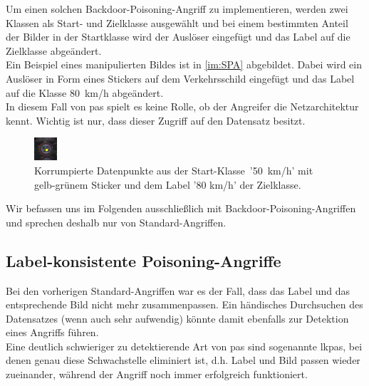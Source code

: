 \documentclass[twoside, 12pt,a4paper]{book}
\numberwithin{equation}{section}
\begin{document}
	\noindent Um einen solchen Backdoor-Poisoning-Angriff zu implementieren, werden zwei Klassen als Start- und Zielklasse ausgewählt und bei einem bestimmten Anteil der Bilder in der Startklasse wird der Auslöser eingefügt und das Label auf die Zielklasse abgeändert.\\
	
	\noindent Ein Beispiel eines manipulierten Bildes ist in \autoref{im:SPA} abgebildet. Dabei wird ein Auslöser in Form eines Stickers auf dem Verkehrsschild eingefügt und das Label auf die Klasse 80~km/h abgeändert.\\
	
	\noindent In diesem Fall von \acp{pa} spielt es keine Rolle, ob der Angreifer die Netzarchitektur kennt. Wichtig ist nur, dass dieser Zugriff auf den Datensatz besitzt.\\
	
	\begin{figure}[ht]
		\centering
		\includegraphics[width=0.15\textheight]{1450_poison.jpeg}
		
		
		\caption[Visualisierung des Standard-Angriffs]{Korrumpierte Datenpunkte aus der Start-Klasse~'50~km/h' mit gelb-grünem Sticker und dem Label '80 km/h' der Zielklasse.}
		
		\label{im:SPA}
	\end{figure}
	
	\noindent Wir befassen uns im Folgenden ausschließlich mit Backdoor-Poisoning-An\-grif\-fen
	und sprechen deshalb nur von Standard-Angriffen.\\
	
	
	
	\subsection{Label-konsistente Poisoning-Angriffe}
	Bei den vorherigen Standard-Angriffen war es der Fall, dass das Label und das entsprechende Bild nicht mehr zusammenpassen. Ein händisches Durchsuchen des Datensatzes (wenn auch sehr aufwendig) könnte damit ebenfalls zur Detektion eines Angriffs führen.\\
	Eine deutlich schwieriger zu detektierende Art von \acp{pa} sind sogenannte \acfp{lkpa}, bei denen genau diese Schwachstelle eliminiert ist, d.h. Label und Bild passen wieder zueinander, während der Angriff noch immer erfolgreich funktioniert.
	
\end{document}
